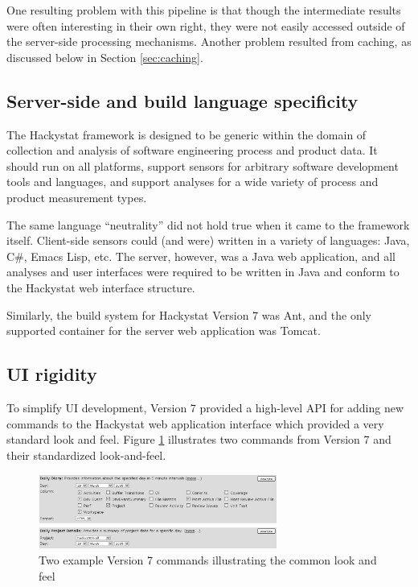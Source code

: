 \documentclass[conference,compsoc,peerreview]{IEEEtran}
\begin{document}
One resulting problem with this pipeline is that though the intermediate
results were often interesting in their own right, they were not easily
accessed outside of the server-side processing mechanisms. Another problem 
resulted from caching, as discussed below in Section \ref{sec:caching}.

\subsection{Server-side and build language specificity}

The Hackystat framework is designed to be generic within the domain of
collection and analysis of software engineering process and product data.
It should run on all platforms, support sensors for arbitrary software
development tools and languages, and support analyses for a wide variety of
process and product measurement types.

The same language ``neutrality'' did not hold true when it came to the
framework itself.  Client-side sensors could (and were) written in a
variety of languages: Java, C\#, Emacs Lisp, etc. The server, however, was
a Java web application, and all analyses and user interfaces were required
to be written in Java and conform to the Hackystat web interface structure.

Similarly, the build system for Hackystat Version 7 was Ant, and the only
supported container for the server web application was Tomcat.

\subsection{UI rigidity}

To simplify UI development, Version 7 provided a high-level API for adding
new commands to the Hackystat web application interface which provided a
very standard look and feel.  Figure \ref{fig:commands} illustrates two
commands from Version 7 and their standardized look-and-feel.

\begin{figure}[ht]
  \center
  \includegraphics[width=0.7\textwidth]{v7commands.eps}
  \caption{Two example Version 7 commands illustrating the common look and feel}
  \label{fig:commands}
\end{figure} 
\end{document}
